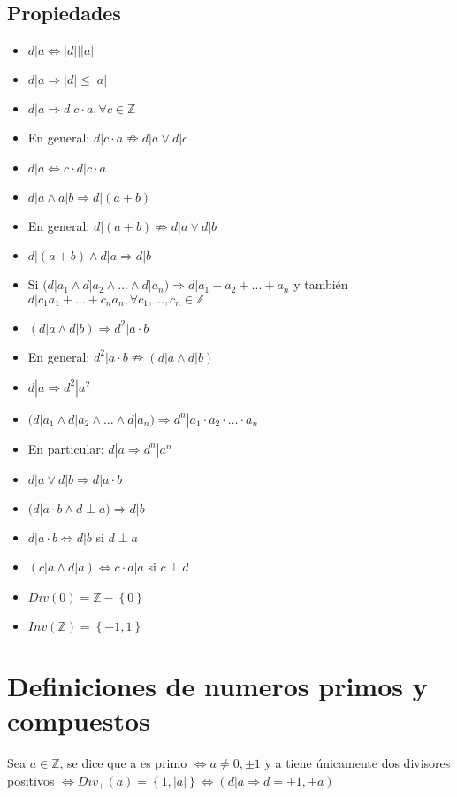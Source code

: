 \documentclass{report}
\begin{document}
\subsection{Propiedades}
\begin{itemize}
    \item $d|a \iff |d| | |a|$
    \item $d|a \Rightarrow |d| \leq |a|$
    \item $d|a \Rightarrow d|c \cdot a, \forall c \in \mathbb{Z}$
    \item En general: $d|c \cdot a \nRightarrow d|a \lor d|c$
    \item $d|a \iff c \cdot d | c \cdot a$
    \item $d|a \land a|b \Rightarrow d|(a+b)$
    \item En general: $d|(a+b) \nRightarrow d|a \lor d|b$
    \item $d|(a+b) \land d|a \Rightarrow d|b$
    \item Si $(d|a_1 \land d|a_2 \land ... \land d|a_n) \Rightarrow d|a_1 + a_2 + ... + a_n$ y también $d|c_1a_1 + ... + c_na_n, \forall c_1,...,c_n \in \mathbb{Z}$
    \item $(d|a \land d|b) \Rightarrow d^2|a \cdot b$
    \item En general: $d^2|a \cdot b \nRightarrow (d|a \land d|b)$
    \item $d|a \Rightarrow d^2|a^2$
    \item $(d|a_1 \land d|a_2 \land ... \land d|a_n) \Rightarrow d^n|a_1 \cdot a_2 \cdot ... \cdot a_n$
    \item En particular: $d|a \Rightarrow d^n | a^n$
    \item $d|a \lor d|b \Rightarrow d|a \cdot b$
    \item $(d| a \cdot b \land d \perp a) \Rightarrow d|b$
    \item $d|a \cdot b \iff d|b$ si $d \perp a$
    \item $(c|a \land d|a) \iff c \cdot d|a$ si $c \perp d$
    \item $Div (0) = \mathbb{Z}-\left\{0\right\}$
    \item $Inv (\mathbb{Z}) = \left\{-1,1\right\}$
\end{itemize}

\section{Definiciones de numeros primos y compuestos}
Sea $a \in \mathbb{Z}$, se dice que a es primo $\iff a \neq 0, \pm 1$ y a tiene únicamente dos divisores positivos $\iff Div_+ (a) = \left\{1, |a|\right\} \iff (d|a \Rightarrow d = \pm 1, \pm a)$
\end{document}
